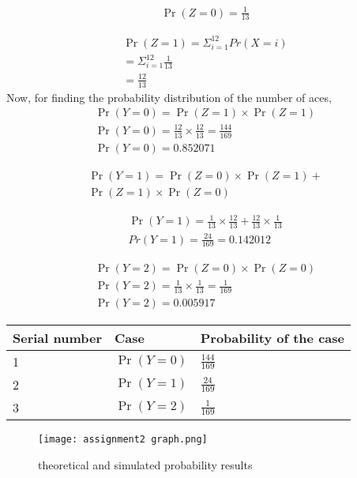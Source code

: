\documentclass[journal,12pt,twocolumn]{IEEEtran}
\begin{document}
\begin{align}
    \Pr(Z=0) = \frac{1}{13}
\end{align}

\begin{align}
    \Pr(Z=1) = \Sigma_{i=1}^{12} Pr(X=i)
    \\ = \Sigma_{i=1}^{12}\frac{1}{13}
    \\ = \frac{12}{13}
\end{align}
Now, for finding the probability distribution of the number of aces, 
\begin{align}
    \Pr(Y=0) = \Pr(Z=1) \times \Pr(Z=1)
    \\\Pr(Y=0) = \frac{12}{13} \times \frac{12}{13} = \frac{144}{169}
    \\\Pr(Y=0) = 0.852071
\end{align}
 


\begin{multline}
    \Pr(Y=1) = \Pr(Z=0) \times \Pr(Z=1) + 
    \\\Pr(Z=1) \times \Pr(Z=0)
\end{multline} 

\begin{align}
    \Pr(Y=1) = \frac{1}{13} \times \frac{12}{13} + \frac{12}{13} \times \frac{1}{13}
    \\Pr(Y=1) = \frac{24}{169} = 0.142012
\end{align}    
   


\begin{align}
    \Pr(Y=2) = \Pr(Z=0) \times \Pr(Z=0)
    \\\Pr(Y=2) = \frac{1}{13} \times \frac{1}{13} = \frac{1}{169}
    \\\Pr(Y=2) = 0.005917
\end{align}
\begin{center}
\begin{tabular}{ | m{2.5cm} | m{2cm}| m{4cm} | } 
\hline
Serial number & Case & Probability of the case \\ 
\hline
1 & $\Pr(Y=0)$ & $\frac{144}{169}$ \\ 
\hline
2 & $\Pr(Y=1)$ & $\frac{24}{169}$ \\ 
\hline
3 & $\Pr(Y=2)$ & $\frac{1}{169}$ \\
\hline

\end{tabular}
\end{center}

\begin{figure} [H]
    \texttt{[image: assignment2 graph.png]}
    \caption{theoretical and simulated probability results}
\end{figure}
\end{document}
